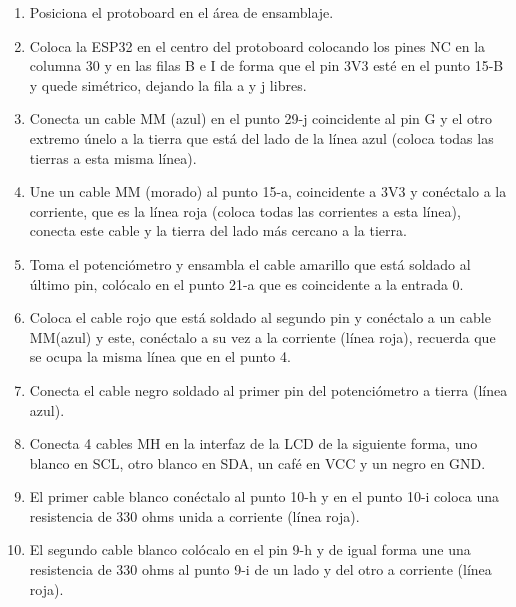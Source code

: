     \begin{enumerate}
    
        \item Posiciona el protoboard en el área de ensamblaje.
    
        \item Coloca la ESP32 en el centro del protoboard colocando los pines NC en la columna 30 y en las filas B e I de forma que el pin 3V3 esté en el punto 15-B y quede simétrico, dejando la fila a y j libres. 
    
        \item Conecta un cable MM (azul) en el punto 29-j coincidente al pin G y el otro extremo únelo a la tierra que está del lado de la línea azul (coloca todas las tierras a esta misma línea).
    
        \item Une un cable MM (morado) al punto 15-a, coincidente a 3V3 y conéctalo a la corriente, que es la línea roja (coloca todas las corrientes a esta línea), conecta este cable y la tierra del lado más cercano a la tierra. 
    
        \item Toma el potenciómetro y ensambla el cable amarillo que está soldado al último pin, colócalo en el punto 21-a que es coincidente a la entrada 0.
    
        \item Coloca el cable rojo que está soldado al segundo pin y conéctalo a un cable MM(azul) y este, conéctalo a su vez a la corriente (línea roja), recuerda que se ocupa la misma línea que en el punto 4. 
    
        \item Conecta el cable negro soldado al primer pin del potenciómetro a tierra (línea azul). 
    
        \item Conecta 4 cables MH en la interfaz de la LCD de la siguiente forma, uno blanco en SCL, otro blanco en SDA, un café en VCC y un negro en GND. 
    
        \item El primer cable blanco conéctalo al punto 10-h y en el punto 10-i coloca una resistencia de 330 ohms unida a corriente (línea roja).
    
        \item El segundo cable blanco colócalo en el pin 9-h y de igual forma une una resistencia de 330 ohms al punto 9-i de un lado y del otro a corriente (línea roja).
    

\end{enumerate}
